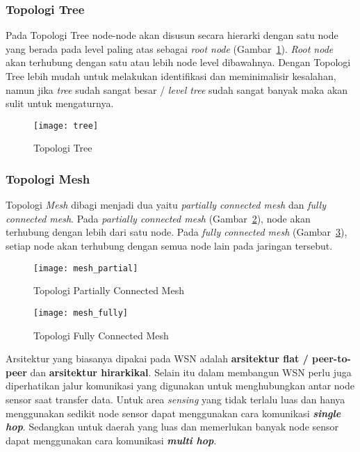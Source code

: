 \subsubsection{Topologi Tree}
Pada Topologi Tree node-node akan disusun secara hierarki dengan satu node yang berada pada level paling atas sebagai \textit{root node} (Gambar~\ref{fig:tree}). \textit{Root node} akan terhubung dengan satu atau lebih node level dibawahnya. Dengan Topologi Tree lebih mudah untuk melakukan identifikasi dan meminimalisir kesalahan, namun jika \textit{tree} sudah sangat besar / \textit{level tree} sudah sangat banyak maka akan sulit untuk mengaturnya.
\begin{figure} [H]
	\centering  
	\texttt{[image: tree]}  
	\caption[Topologi Tree]{Topologi Tree} 
	\label{fig:tree} 
\end{figure} 

\subsubsection{Topologi Mesh}
Topologi \textit{Mesh} dibagi menjadi dua yaitu \textit{partially connected mesh} dan \textit{fully connected mesh}. Pada \textit{partially connected mesh} (Gambar~\ref{fig:mesh_partial}), node akan terhubung dengan lebih dari satu node. Pada \textit{fully connected mesh} (Gambar~\ref{fig:mesh_fully}), setiap node akan terhubung dengan semua node lain pada jaringan tersebut.
\begin{figure} [H]
	\centering  
	\texttt{[image: mesh\_partial]}  
	\caption[Topologi Partially Connected Mesh]{Topologi Partially Connected Mesh} 
	\label{fig:mesh_partial} 
\end{figure} 
\begin{figure} [H]
	\centering  
	\texttt{[image: mesh\_fully]}  
	\caption[Topologi Fully Connected Mesh]{Topologi Fully Connected Mesh} 
	\label{fig:mesh_fully} 
\end{figure} 

Arsitektur yang biasanya dipakai pada WSN adalah \textbf{arsitektur flat / peer-to-peer} dan \textbf{arsitektur hirarkikal}. Selain itu dalam membangun WSN perlu juga diperhatikan jalur komunikasi yang digunakan untuk menghubungkan antar node sensor saat transfer data. Untuk area \textit{sensing} yang tidak terlalu luas dan hanya menggunakan sedikit node sensor dapat menggunakan cara komunikasi \textbf{\textit{single hop}}. Sedangkan untuk daerah yang luas dan memerlukan banyak node sensor dapat menggunakan cara komunikasi \textbf{\textit{multi hop}}. 

